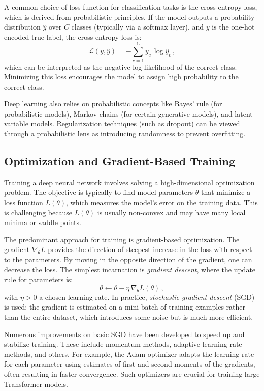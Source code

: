 \documentclass[conference]{IEEEtran}
\begin{document}
A common choice of loss function for classification tasks is the cross-entropy loss, which is derived from probabilistic principles. If the model outputs a probability distribution $\hat{y}$ over $C$ classes (typically via a softmax layer), and $y$ is the one-hot encoded true label, the cross-entropy loss is:
\begin{equation}
\mathcal{L}(y,\hat{y}) = -\sum_{c=1}^{C} y_c \, \log \hat{y}_c\,,
\end{equation}
which can be interpreted as the negative log-likelihood of the correct class. Minimizing this loss encourages the model to assign high probability to the correct class.

Deep learning also relies on probabilistic concepts like Bayes' rule (for probabilistic models), Markov chains (for certain generative models), and latent variable models. Regularization techniques (such as dropout) can be viewed through a probabilistic lens as introducing randomness to prevent overfitting.

\subsection{Optimization and Gradient-Based Training}
Training a deep neural network involves solving a high-dimensional optimization problem. The objective is typically to find model parameters $\theta$ that minimize a loss function $L(\theta)$, which measures the model's error on the training data. This is challenging because $L(\theta)$ is usually non-convex and may have many local minima or saddle points.

The predominant approach for training is gradient-based optimization. The gradient $\nabla_{\theta}L$ provides the direction of steepest increase in the loss with respect to the parameters. By moving in the opposite direction of the gradient, one can decrease the loss. The simplest incarnation is \emph{gradient descent}, where the update rule for parameters is:
\begin{equation}
\theta \leftarrow \theta - \eta \, \nabla_{\theta}L(\theta)\,,
\end{equation}
with $\eta > 0$ a chosen learning rate. In practice, \emph{stochastic gradient descent} (SGD) is used: the gradient is estimated on a mini-batch of training examples rather than the entire dataset, which introduces some noise but is much more efficient.

Numerous improvements on basic SGD have been developed to speed up and stabilize training. These include momentum methods, adaptive learning rate methods, and others. For example, the Adam optimizer \cite{kingma2015} adapts the learning rate for each parameter using estimates of first and second moments of the gradients, often resulting in faster convergence. Such optimizers are crucial for training large Transformer models.
\end{document}
